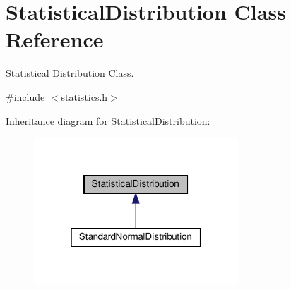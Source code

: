 \hypertarget{classStatisticalDistribution}{}\section{Statistical\+Distribution Class Reference}
\label{classStatisticalDistribution}


Statistical Distribution Class.  




{\ttfamily \#include $<$statistics.\+h$>$}



Inheritance diagram for Statistical\+Distribution\+:\nopagebreak
\begin{figure}[H]
\begin{center}
\leavevmode
\includegraphics[width=217pt]{classStatisticalDistribution__inherit__graph}
\end{center}
\end{figure}
